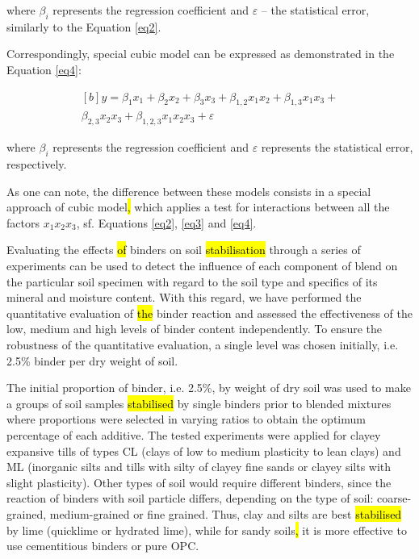 \documentclass[eprint,
]{actapoly}
\begin{document}
where $\beta_i$ represents the regression coefficient and $\varepsilon$ -- the statistical error, similarly to the Equation \ref{eq2}.

Correspondingly, special cubic model can be expressed as demonstrated in the Equation \ref{eq4}:

\begin{equation}\label{eq4}
\begin{aligned}[b]
y=\beta_{1}x_{1}+\beta_{2}x_{2}+\beta_{3}x_{3}+\beta_{1,2}x_{1}x_{2}+\beta_{1,3}x_{1}x_{3}+\\\beta_{2,3}x_{2}x_{3}+\beta_{1,2,3}x_{1}x_{2}x_{3}+\varepsilon
\end{aligned}
\end{equation}

where $\beta_i$ represents the regression coefficient and $\varepsilon$ represents the statistical error, respectively. 

As one can note, the difference between these models consists in a special approach of cubic model\hl{, }which applies a test for interactions between all the factors $x_{1}x_{2}x_{3}$, sf. Equations \ref{eq2}, \ref{eq3} and \ref{eq4}.

Evaluating the effects \hl{of} binders on soil \hl{stabilisation} through a series of experiments can be used to detect the influence of each component of blend on the particular soil specimen with regard to the soil type and specifics of its mineral and moisture content. With this regard, we have performed the quantitative evaluation of \hl{the} binder reaction and assessed the effectiveness of the low, medium and high levels of binder content independently. To ensure the robustness of the quantitative evaluation, a single level was chosen initially, i.e.\hl{ }2.5\% binder per dry weight of soil. 

The initial proportion of binder, i.e.\hl{ }2.5\%, by weight of dry soil was used to make a groups of soil samples \hl{stabilised} by single binders prior to blended mixtures where proportions were selected in varying ratios to obtain the optimum percentage of each additive. The tested experiments were applied for clayey expansive tills of types CL (clays of low to medium plasticity to lean clays) and ML (inorganic silts and tills with silty of clayey fine sands or clayey silts with slight plasticity). Other types of soil would require different binders, since the reaction of binders with soil particle differs, depending on the type of soil: coarse-grained, medium-grained or fine grained. Thus, clay and silts are best \hl{stabilised} by lime (quicklime or hydrated lime), while for sandy soils\hl{, }it is more effective to use cementitious binders or pure OPC.
\end{document}
